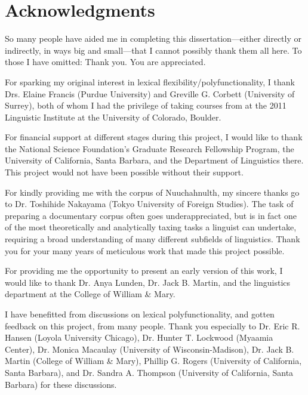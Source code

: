 \clearpage
{}
\section*{Acknowledgments}
\label{sec:acknowledgments}

\singlespacing

So many people have aided me in completing this dissertation—either directly or indirectly, in ways big and small—that I cannot possibly thank them all here. To those I have omitted: Thank you. You are appreciated.

For sparking my original interest in lexical flexibility/polyfunctionality, I thank Drs. Elaine Francis (Purdue University) and Greville G. Corbett (University of Surrey), both of whom I had the privilege of taking courses from at the 2011 Linguistic Institute at the University of Colorado, Boulder.

For financial support at different stages during this project, I would like to thank the National Science Foundation's Graduate Research Fellowship Program, the University of California, Santa Barbara, and the Department of Linguistics there. This project would not have been possible without their support.

For kindly providing me with the corpus of Nuuchahnulth, my sincere thanks go to Dr. Toshihide Nakayama (Tokyo University of Foreign Studies). The task of preparing a documentary corpus often goes underappreciated, but is in fact one of the most theoretically and analytically taxing tasks a linguist can undertake, requiring a broad understanding of many different subfields of linguistics. Thank you for your many years of meticulous work that made this project possible.

For providing me the opportunity to present an early version of this work, I would like to thank Dr. Anya Lunden, Dr. Jack B. Martin, and the linguistics department at the College of William \& Mary.

I have benefitted from discussions on lexical polyfunctionality, and gotten feedback on this project, from many people. Thank you especially to Dr. Eric R. Hansen (Loyola University Chicago), Dr. Hunter T. Lockwood (Myaamia Center), Dr. Monica Macaulay (University of Wisconsin-Madison), Dr. Jack B. Martin (College of William \& Mary), Phillip G. Rogers (University of California, Santa Barbara), and Dr. Sandra A. Thompson (University of California, Santa Barbara) for these discussions.

